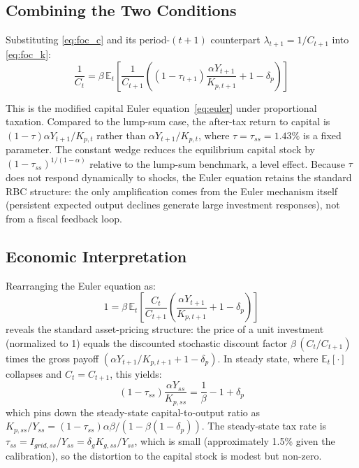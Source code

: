 \documentclass[12pt, a4paper]{article}
\begin{document}
	\subsection*{Combining the Two Conditions}
	
	Substituting \eqref{eq:foc_c} and its period-$(t+1)$ counterpart $\lambda_{t+1} = 1/C_{t+1}$ into \eqref{eq:foc_k}:
	\begin{equation*}
		\frac{1}{C_t} = \beta\,\mathbb{E}_t\!\left[\frac{1}{C_{t+1}}
		\left((1-\tau_{t+1})\frac{\alpha Y_{t+1}}{K_{p,t+1}} + 1 - \delta_p\right)\right]
	\end{equation*}
	
	This is the modified capital Euler equation~\eqref{eq:euler} under proportional taxation. Compared to the lump-sum case, the after-tax return to capital is $(1-\tau)\alpha Y_{t+1}/K_{p,t}$ rather than $\alpha Y_{t+1}/K_{p,t}$, where $\tau = \tau_{ss} = 1.43\%$ is a fixed parameter. The constant wedge reduces the equilibrium capital stock by $(1-\tau_{ss})^{1/(1-\alpha)}$ relative to the lump-sum benchmark, a level effect. Because $\tau$ does not respond dynamically to shocks, the Euler equation retains the standard RBC structure: the only amplification comes from the Euler mechanism itself (persistent expected output declines generate large investment responses), not from a fiscal feedback loop.
	
	\subsection*{Economic Interpretation}
	
	Rearranging the Euler equation as:
	\begin{equation*}
		1 = \beta\,\mathbb{E}_t\!\left[\frac{C_t}{C_{t+1}}
		\left(\frac{\alpha Y_{t+1}}{K_{p,t+1}} + 1 - \delta_p\right)\right]
	\end{equation*}
	reveals the standard asset-pricing structure: the price of a unit investment (normalized to 1) equals the discounted stochastic discount factor $\beta\,(C_t/C_{t+1})$ times the gross payoff $(\alpha Y_{t+1}/K_{p,t+1} + 1 - \delta_p)$. In steady state, where $\mathbb{E}_t[\cdot]$ collapses and $C_t = C_{t+1}$, this yields:
	\begin{equation*}
		(1-\tau_{ss})\frac{\alpha Y_{ss}}{K_{p,ss}} = \frac{1}{\beta} - 1 + \delta_p
	\end{equation*}
	which pins down the steady-state capital-to-output ratio as $K_{p,ss}/Y_{ss} = (1-\tau_{ss})\alpha\beta/(1 - \beta(1-\delta_p))$. The steady-state tax rate is $\tau_{ss} = I_{grid,ss}/Y_{ss} = \delta_g K_{g,ss}/Y_{ss}$, which is small (approximately 1.5\% given the calibration), so the distortion to the capital stock is modest but non-zero.
	
\end{document}
